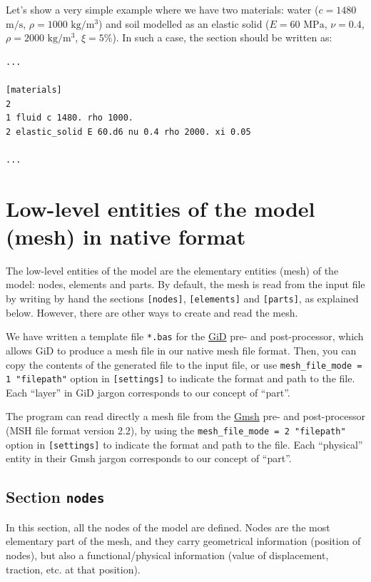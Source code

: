 \documentclass[a4paper,fleqn]{book}
\begin{document}
Let's show a very simple example where we have two materials: water ($c=1480$ $\textrm{m/s}$, $\rho=1000$ $\mathrm{kg/m^3}$) and soil modelled as an elastic solid ($E=60$ $\mathrm{MPa}$, $\nu=0.4$, $\rho=2000$ $\mathrm{kg/m^3}$, $\xi=5\%$). In such a case, the section should be written as:
\begin{Verbatim}[frame=single, fontsize=\small, label=input.dat]
...

[materials]
2
1 fluid c 1480. rho 1000.
2 elastic_solid E 60.d6 nu 0.4 rho 2000. xi 0.05

...
\end{Verbatim}

\section{Low-level entities of the model (mesh) in native format}
The low-level entities of the model are the elementary entities (mesh) of the model: nodes, elements and parts. By default, the mesh is read from the input file by writing by hand the sections \texttt{[nodes]}, \texttt{[elements]} and \texttt{[parts]}, as explained below. However, there are other ways to create and read the mesh.

We have written a template file \texttt{*.bas} for the \href{http://www.gidhome.com/}{GiD} pre- and post-processor, which allows GiD to produce a mesh file in our native mesh file format. Then, you can copy the contents of the generated file to the input file, or use \texttt{mesh\_file\_mode = 1 "filepath"} option in \texttt{[settings]} to indicate the format and path to the file. Each ``layer'' in GiD jargon corresponds to our concept of ``part''.

The program can read directly a mesh file from the \href{http://gmsh.info/}{Gmsh} pre- and post-processor (MSH file format version 2.2), by using the \texttt{mesh\_file\_mode = 2 "filepath"} option in \texttt{[settings]} to indicate the format and path to the file. Each ``physical'' entity in their Gmsh jargon corresponds to our concept of ``part''.

\subsection{Section \texttt{nodes}}

In this section, all the nodes of the model are defined. Nodes are the most elementary part of the mesh, and they carry geometrical information (position of nodes), but also a functional/physical information (value of displacement, traction, etc. at that position). 
\end{document}
